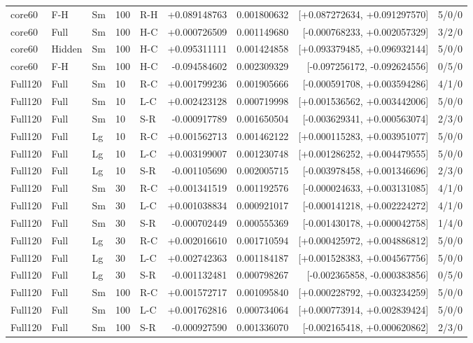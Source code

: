 \begin{longtable}{lllllrrrr}
core60 & F-H & Sm & 100 & R-H & +0.089148763 & 0.001800632 & [+0.087272634, +0.091297570] & 5/0/0 \\
core60 & Full & Sm & 100 & H-C & +0.000726509 & 0.001149680 & [-0.000768233, +0.002057329] & 3/2/0 \\
core60 & Hidden & Sm & 100 & H-C & +0.095311111 & 0.001424858 & [+0.093379485, +0.096932144] & 5/0/0 \\
core60 & F-H & Sm & 100 & H-C & -0.094584602 & 0.002309329 & [-0.097256172, -0.092624556] & 0/5/0 \\
Full120 & Full & Sm & 10 & R-C & +0.001799236 & 0.001905666 & [-0.000591708, +0.003594286] & 4/1/0 \\
Full120 & Full & Sm & 10 & L-C & +0.002423128 & 0.000719998 & [+0.001536562, +0.003442006] & 5/0/0 \\
Full120 & Full & Sm & 10 & S-R & -0.000917789 & 0.001650504 & [-0.003629341, +0.000563074] & 2/3/0 \\
Full120 & Full & Lg & 10 & R-C & +0.001562713 & 0.001462122 & [+0.000115283, +0.003951077] & 5/0/0 \\
Full120 & Full & Lg & 10 & L-C & +0.003199007 & 0.001230748 & [+0.001286252, +0.004479555] & 5/0/0 \\
Full120 & Full & Lg & 10 & S-R & -0.001105690 & 0.002005715 & [-0.003978458, +0.001346696] & 2/3/0 \\
Full120 & Full & Sm & 30 & R-C & +0.001341519 & 0.001192576 & [-0.000024633, +0.003131085] & 4/1/0 \\
Full120 & Full & Sm & 30 & L-C & +0.001038834 & 0.000921017 & [-0.000141218, +0.002224272] & 4/1/0 \\
Full120 & Full & Sm & 30 & S-R & -0.000702449 & 0.000555369 & [-0.001430178, +0.000042758] & 1/4/0 \\
Full120 & Full & Lg & 30 & R-C & +0.002016610 & 0.001710594 & [+0.000425972, +0.004886812] & 5/0/0 \\
Full120 & Full & Lg & 30 & L-C & +0.002742363 & 0.001184187 & [+0.001528383, +0.004567756] & 5/0/0 \\
Full120 & Full & Lg & 30 & S-R & -0.001132481 & 0.000798267 & [-0.002365858, -0.000383856] & 0/5/0 \\
Full120 & Full & Sm & 100 & R-C & +0.001572717 & 0.001095840 & [+0.000228792, +0.003234259] & 5/0/0 \\
Full120 & Full & Sm & 100 & L-C & +0.001762816 & 0.000734064 & [+0.000773914, +0.002839424] & 5/0/0 \\
Full120 & Full & Sm & 100 & S-R & -0.000927590 & 0.001336070 & [-0.002165418, +0.000620862] & 2/3/0 \\

\end{longtable}
